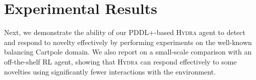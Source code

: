 \documentclass[letterpaper]{article} %
\newcommand{\hydra}{\textsc{Hydra}\xspace} %
\begin{document}







\section{Experimental Results}


Next, we demonstrate the ability of our PDDL+-based \hydra agent to detect and respond to novelty effectively by performing experiments on the well-known balancing Cartpole domain. We also report on a small-scale comparison with an off-the-shelf RL agent, showing that \hydra can respond effectively to some novelties using significantly fewer interactions with the environment. 
\end{document}
